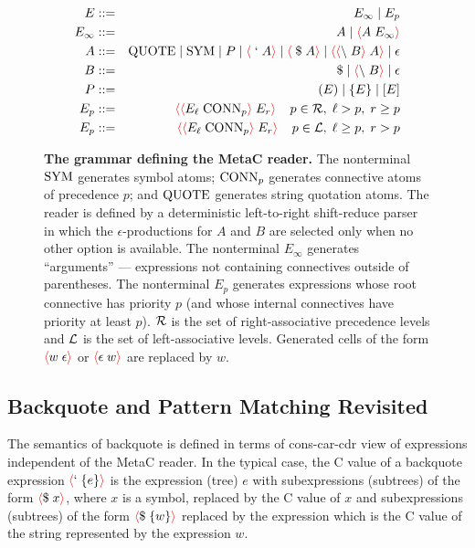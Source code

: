 \documentclass{article}
\newcommand{\fopen}{{\color{red} \langle}}
\newcommand{\fclose}{{\color{red} \rangle}}
\begin{document}
\begin{figure}
  
\begin{eqnarray*}
  E & ::= & E_\infty \;|\; E_p \\
  E_\infty & ::= & A \;|\; \fopen A \; E_\infty \fclose \\
  A & ::= & \quot \;|\; \sym \;|\; P  \;|\; \fopen \; `\;A\fclose \;|\; \fopen \; \$\;A\fclose \;|\;\fopen\fopen\backslash\; B \fclose\;A \fclose \;|\; \epsilon \\
  B & ::= & \$ \;|\; \fopen \backslash\;B \fclose \;|\; \epsilon \\
  P & ::= & (E) \;|\; \{E\} \;|\; [E] \\
  E_p & ::= & \fopen \fopen  E_\ell\;\conn_p \fclose \;E_r\fclose\;\;\;\;p \in {\cal R}, \;\ell > p, \; r \geq p \\
  E_p & ::= & \fopen \fopen E_\ell\;\conn_p \fclose \;E_r\fclose\;\;\;\;p \in {\cal L}, \; \ell \geq p,\; r > p
\end{eqnarray*}

\caption{{\bf The grammar defining the MetaC reader.}
The nonterminal $\mathrm{SYM}$ generates symbol atoms; $\mathrm{CONN}_p$ generates connective atoms of precedence $p$; and $\mathrm{QUOTE}$ generates string quotation atoms.
The reader is defined by a deterministic left-to-right shift-reduce parser
in which the $\epsilon$-productions for $A$ and $B$ are selected only when no other option is available.
The nonterminal $E_\infty$ generates ``arguments'' --- expressions not containing connectives outside of parentheses.
The nonterminal $E_p$ generates expressions whose root connective has priority $p$ (and whose internal connectives have priority at least $p$).
${\cal R}$ is the set of right-associative precedence levels and ${\cal L}$ is the set of left-associative levels.
Generated cells of the form $\fopen w\;\epsilon \fclose$ or $\fopen \epsilon \;w\fclose$ are replaced by $w$.
}
\label{fig:grammar}
\end{figure}

\subsection{Backquote and Pattern Matching Revisited}

The semantics of backquote is defined in terms of cons-car-cdr view of expressions independent of the MetaC reader.
In the typical case, the C value of a backquote expression
$\fopen ` \;\{e\}\fclose$ is the expression (tree) $e$ with subexpressions (subtrees) of the form $\fopen \$\;x \fclose$, where $x$ is a symbol,
replaced by the C value of $x$
and subexpressions (subtrees) of the form $\fopen \$\;\{w\}\fclose$ replaced by the expression which is the C value of the string represented by the expression $w$.
\end{document}
